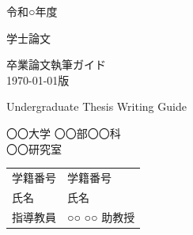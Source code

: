 \documentclass[./main.tex]{subfiles}
\begin{document}
\begin{titlepage}
    \fontsize{28pt}{34pt} \selectfont

    \centering
    令和○年度
    \vspace{15pt}

    学士論文
    \vspace{45pt}

    卒業論文執筆ガイド \\
    {\LARGE \today 版}
    \vspace{1 \zh}

    Undergraduate Thesis Writing Guide
    \vspace*{\fill}


    \fontsize{20pt}{20pt} \selectfont

    〇〇大学 〇〇部〇〇科 \\〇〇研究室
    \vspace{45pt}

    \begin{tabular}{ll}
        学籍番号 & 学籍番号      \\
        氏名   & 氏名        \\
        指導教員 & ○○ ○○ 助教授 \\
    \end{tabular}
    \normalsize

\end{titlepage}
\end{document}
